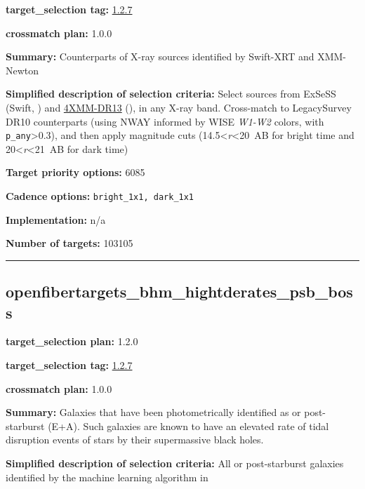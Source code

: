 \noindent\textbf{target\_selection tag:}
\href{https://github.com/sdss/target_selection/tree/1.2.7/}{1.2.7}

\noindent\textbf{crossmatch plan:} 1.0.0

\noindent\textbf{Summary:} Counterparts of X-ray sources identified by Swift-XRT
and XMM-Newton

\noindent\textbf{Simplified description of selection criteria:} Select sources
from ExSeSS (Swift,
\citealt{Delaney2023}) and
\href{http://xmmssc.irap.omp.eu/Catalog/4XMM-DR13/4XMM_DR13.html}{4XMM-DR13}
(\citealt{Webb2020}), in any X-ray band. Cross-match to LegacySurvey DR10
counterparts (using NWAY informed by WISE \emph{W1-W2} colors, with
\texttt{p\_any}\textgreater0.3), and then apply magnitude cuts
(14.5\textless{}\emph{r}\textless20~AB for bright time and
20\textless{}\emph{r}\textless21~AB for dark time)


\noindent\textbf{Target priority options:} 6085

\noindent\textbf{Cadence options:} \texttt{bright\_1x1,\ dark\_1x1}

\noindent\textbf{Implementation:} n/a

\noindent\textbf{Number of targets:} 103105

\begin{center}\rule{0.5\linewidth}{0.5pt}\end{center}

\hypertarget{openfibertargets_bhm_hightderates_psb_boss_plan1.2.0}{%
\subsection{openfibertargets\_bhm\_hightderates\_psb\_boss}\label{openfibertargets_bhm_hightderates_psb_boss_plan1.2.0}}

\noindent\textbf{target\_selection plan:} 1.2.0

\noindent\textbf{target\_selection tag:}
\href{https://github.com/sdss/target_selection/tree/1.2.7/}{1.2.7}

\noindent\textbf{crossmatch plan:} 1.0.0

\noindent\textbf{Summary:} Galaxies that have been photometrically identified as
or post-starburst (E+A). Such galaxies are known to have an elevated
rate of tidal disruption events of stars by their supermassive black
holes.

\noindent\textbf{Simplified description of selection criteria:} All or
post-starburst galaxies identified by the machine learning algorithm in
\citealt{French2018}


